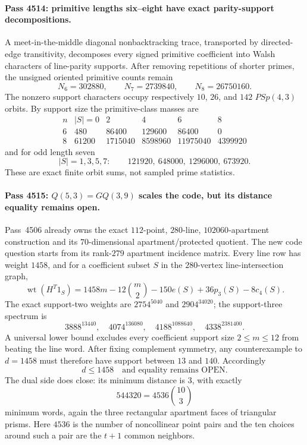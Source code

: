 \paragraph{Pass 4514: primitive lengths six--eight have exact parity-support decompositions.}
A meet-in-the-middle diagonal nonbacktracking trace, transported by directed-edge
transitivity, decomposes every signed primitive coefficient into Walsh characters
of line-parity supports.  After removing repetitions of shorter primes, the
unsigned oriented primitive counts remain
\[
N_6=302880,\qquad N_7=2739840,\qquad N_8=26750160.
\]
The nonzero support characters occupy respectively $10$, $26$, and $142$
$PSp(4,3)$ orbits.  By support size the primitive-class masses are
\[
\begin{array}{c|rrrrr}
 n & |S|=0&2&4&6&8\\ \hline
6&480&86400&129600&86400&0\\
8&61200&1715040&8598960&11975040&4399920
\end{array}
\]
and for odd length seven
\[
 |S|=1,3,5,7:\qquad 121920,\ 648000,\ 1296000,\ 673920.
\]
These are exact finite orbit sums, not sampled prime statistics.

\paragraph{Pass 4515: $Q(5,3)=GQ(3,9)$ scales the code, but its distance equality remains open.}
Pass~4506 already owns the exact $112$-point, $280$-line, $102060$-apartment
construction and its $70$-dimensional apartment/protected quotient.  The new code
question starts from its rank-$279$ apartment incidence matrix.  Every line row
has weight $1458$, and for a coefficient subset $S$ in the $280$-vertex
line-intersection graph,
\[
 \boxed{\operatorname{wt}(H^T1_S)
 =1458m-12{m\choose2}-150e(S)+36p_3(S)-8c_4(S).}
\]
The exact support-two weights are $2754^{5040}$ and $2904^{34020}$; the
support-three spectrum is
\[
3888^{13440},\quad4074^{136080},\quad4188^{1088640},\quad4338^{2381400}.
\]
A universal lower bound excludes every coefficient support size $2\le m\le12$
from beating the line word.  After fixing complement symmetry, any counterexample
to $d=1458$ must therefore have support between $13$ and $140$.  Accordingly
\[
 \boxed{d\le1458\quad\text{and equality remains OPEN}.}
\]
The dual side does close: its minimum distance is $3$, with exactly
\[
 \boxed{544320=4536{10\choose3}}
\]
minimum words, again the three rectangular apartment faces of triangular prisms.
Here $4536$ is the number of noncollinear point pairs and the ten choices around
such a pair are the $t+1$ common neighbors.

